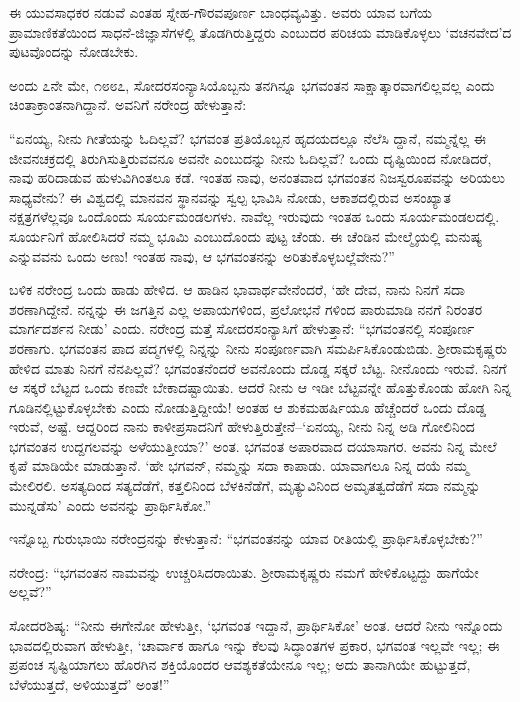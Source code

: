 ಈ ಯುವಸಾಧಕರ ನಡುವೆ ಎಂತಹ ಸ್ನೇಹ-ಗೌರವಪೂರ್ಣ ಬಾಂಧವ್ಯವಿತ್ತು. ಅವರು ಯಾವ ಬಗೆಯ ಪ್ರಾಮಾಣಿಕತೆಯಿಂದ ಸಾಧನೆ-ಜಿಜ್ಞಾಸೆಗಳಲ್ಲಿ ತೊಡಗಿರುತ್ತಿದ್ದರು ಎಂಬುದರ ಪರಿಚಯ ಮಾಡಿಕೊಳ್ಳಲು ‘ವಚನವೇದ’ದ ಪುಟವೊಂದನ್ನು ನೋಡಬೇಕು.

ಅಂದು ೭ನೇ ಮೇ, ೧೮೮೭, ಸೋದರಸಂನ್ಯಾಸಿಯೊಬ್ಬನು ತನಗಿನ್ನೂ ಭಗವಂತನ ಸಾಕ್ಷಾತ್ಕಾರವಾಗಲಿಲ್ಲವಲ್ಲ ಎಂದು ಚಿಂತಾಕ್ರಾಂತನಾಗಿದ್ದಾನೆ. ಅವನಿಗೆ ನರೇಂದ್ರ ಹೇಳುತ್ತಾನೆ:

“ಏನಯ್ಯ, ನೀನು ಗೀತೆಯನ್ನು ಓದಿಲ್ಲವೆ? ಭಗವಂತ ಪ್ರತಿಯೊಬ್ಬನ ಹೃದಯದಲ್ಲೂ ನೆಲೆಸಿ ದ್ದಾನೆ, ನಮ್ಮನ್ನೆಲ್ಲ ಈ ಜೀವನಚಕ್ರದಲ್ಲಿ ತಿರುಗಿಸುತ್ತಿರುವವನೂ ಅವನೇ ಎಂಬುದನ್ನು ನೀನು ಓದಿಲ್ಲವೆ? ಒಂದು ದೃಷ್ಟಿಯಿಂದ ನೋಡಿದರೆ, ನಾವು ಹರಿದಾಡುವ ಹುಳುವಿಗಿಂತಲೂ ಕಡೆ. ಇಂತಹ ನಾವು, ಅನಂತವಾದ ಭಗವಂತನ ನಿಜಸ್ವರೂಪವನ್ನು ಅರಿಯಲು ಸಾಧ್ಯವೇನು? ಈ ವಿಶ್ವದಲ್ಲಿ ಮಾನವನ ಸ್ಥಾನವನ್ನು ಸ್ವಲ್ಪ ಭಾವಿಸಿ ನೋಡು, ಆಕಾಶದಲ್ಲಿರುವ ಅಸಂಖ್ಯಾತ ನಕ್ಷತ್ರಗಳೆಲ್ಲವೂ ಒಂದೊಂದು ಸೂರ್ಯಮಂಡಲಗಳು. ನಾವೆಲ್ಲ ಇರುವುದು ಇಂತಹ ಒಂದು ಸೂರ್ಯಮಂಡಲದಲ್ಲಿ. ಸೂರ್ಯನಿಗೆ ಹೋಲಿಸಿದರೆ ನಮ್ಮ ಭೂಮಿ ಎಂಬುದೊಂದು ಪುಟ್ಟ ಚೆಂಡು. ಈ ಚೆಂಡಿನ ಮೇಲ್ಮೈಯಲ್ಲಿ ಮನುಷ್ಯ ಎನ್ನುವವನು ಒಂದು ಅಣು! ಇಂತಹ ನಾವು, ಆ ಭಗವಂತನನ್ನು ಅರಿತುಕೊಳ್ಳಬಲ್ಲೆವೇನು?”

ಬಳಿಕ ನರೇಂದ್ರ ಒಂದು ಹಾಡು ಹೇಳಿದ. ಆ ಹಾಡಿನ ಭಾವಾರ್ಥವೇನೆಂದರೆ, ‘ಹೇ ದೇವ, ನಾನು ನಿನಗೆ ಸದಾ ಶರಣಾಗಿದ್ದೇನೆ. ನನ್ನನ್ನು ಈ ಜಗತ್ತಿನ ಎಲ್ಲ ಅಪಾಯಗಳಿಂದ, ಪ್ರಲೋಭನೆ ಗಳಿಂದ ಪಾರುಮಾಡಿ ನನಗೆ ನಿರಂತರ ಮಾರ್ಗದರ್ಶನ ನೀಡು’ ಎಂದು. ನರೇಂದ್ರ ಮತ್ತೆ ಸೋದರಸಂನ್ಯಾಸಿಗೆ ಹೇಳುತ್ತಾನೆ: “ಭಗವಂತನಲ್ಲಿ ಸಂಪೂರ್ಣ ಶರಣಾಗು. ಭಗವಂತನ ಪಾದ ಪದ್ಮಗಳಲ್ಲಿ ನಿನ್ನನ್ನು ನೀನು ಸಂಪೂರ್ಣವಾಗಿ ಸಮರ್ಪಿಸಿಕೊಂಡುಬಿಡು. ಶ್ರೀರಾಮಕೃಷ್ಣರು ಹೇಳಿದ ಮಾತು ನಿನಗೆ ನೆನಪಿಲ್ಲವೆ? ಭಗವಂತನೆಂದರೆ ಅವನೊಂದು ದೊಡ್ಡ ಸಕ್ಕರೆ ಬೆಟ್ಟ. ನೀನೊಂದು ಇರುವೆ. ನಿನಗೆ ಆ ಸಕ್ಕರೆ ಬೆಟ್ಟದ ಒಂದು ಕಣವೇ ಬೇಕಾದಷ್ಟಾಯಿತು. ಆದರೆ ನೀನು ಆ ಇಡೀ ಬೆಟ್ಟವನ್ನೇ ಹೊತ್ತುಕೊಂಡು ಹೋಗಿ ನಿನ್ನ ಗೂಡಿನಲ್ಲಿಟ್ಟುಕೊಳ್ಳಬೇಕು ಎಂದು ನೋಡುತ್ತಿದ್ದೀಯೆ! ಅಂತಹ ಆ ಶುಕಮಹರ್ಷಿಯೂ ಹೆಚ್ಚೆಂದರೆ ಒಂದು ದೊಡ್ಡ ಇರುವೆ, ಅಷ್ಟೆ. ಆದ್ದರಿಂದ ನಾನು ಕಾಳೀಪ್ರಸಾದನಿಗೆ ಹೇಳುತ್ತಿರುತ್ತೇನೆ–‘ಏನಯ್ಯ, ನೀನು ನಿನ್ನ ಅಡಿ ಗೋಲಿನಿಂದ ಭಗವಂತನ ಉದ್ದಗಲವನ್ನು ಅಳೆಯುತ್ತೀಯಾ?’ ಅಂತ. ಭಗವಂತ ಅಪಾರವಾದ ದಯಾಸಾಗರ. ಅವನು ನಿನ್ನ ಮೇಲೆ ಕೃಪೆ ಮಾಡಿಯೇ ಮಾಡುತ್ತಾನೆ. ‘ಹೇ ಭಗವನ್, ನಮ್ಮನ್ನು ಸದಾ ಕಾಪಾಡು. ಯಾವಾಗಲೂ ನಿನ್ನ ದಯೆ ನಮ್ಮ ಮೇಲಿರಲಿ. ಅಸತ್ಯದಿಂದ ಸತ್ಯದೆಡೆಗೆ, ಕತ್ತಲಿನಿಂದ ಬೆಳಕಿನೆಡೆಗೆ, ಮೃತ್ಯುವಿನಿಂದ ಅಮೃತತ್ವದೆಡೆಗೆ ಸದಾ ನಮ್ಮನ್ನು ಮುನ್ನಡೆಸು’ ಎಂದು ಅವನನ್ನು ಪ್ರಾರ್ಥಿಸಿಕೋ.”

ಇನ್ನೊಬ್ಬ ಗುರುಭಾಯಿ ನರೇಂದ್ರನನ್ನು ಕೇಳುತ್ತಾನೆ: “ಭಗವಂತನನ್ನು ಯಾವ ರೀತಿಯಲ್ಲಿ ಪ್ರಾರ್ಥಿಸಿಕೊಳ್ಳಬೇಕು?”

ನರೇಂದ್ರ: “ಭಗವಂತನ ನಾಮವನ್ನು ಉಚ್ಚರಿಸಿದರಾಯಿತು. ಶ್ರೀರಾಮಕೃಷ್ಣರು ನಮಗೆ ಹೇಳಿಕೊಟ್ಟದ್ದು ಹಾಗೆಯೇ ಅಲ್ಲವೆ?”

ಸೋದರಶಿಷ್ಯ: “ನೀನು ಈಗೇನೋ ಹೇಳುತ್ತೀ, ‘ಭಗವಂತ ಇದ್ದಾನೆ, ಪ್ರಾರ್ಥಿಸಿಕೋ’ ಅಂತ. ಆದರೆ ನೀನು ಇನ್ನೊಂದು ಭಾವದಲ್ಲಿರುವಾಗ ಹೇಳುತ್ತೀ, ‘ಚಾರ್ವಾಕ ಹಾಗೂ ಇನ್ನು ಕೆಲವು ಸಿದ್ಧಾಂತಗಳ ಪ್ರಕಾರ, ಭಗವಂತ ಇಲ್ಲವೇ ಇಲ್ಲ; ಈ ಪ್ರಪಂಚ ಸೃಷ್ಟಿಯಾಗಲು ಹೊರಗಿನ ಶಕ್ತಿಯೊಂದರ ಆವಶ್ಯಕತೆಯೇನೂ ಇಲ್ಲ; ಅದು ತಾನಾಗಿಯೇ ಹುಟ್ಟುತ್ತದೆ, ಬೆಳೆಯುತ್ತದೆ, ಅಳಿಯುತ್ತದೆ’ ಅಂತ!”

